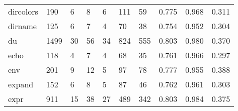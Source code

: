 \begin{longtable}{lp{2.0cm}p{2.0cm}p{2.0cm}p{2.0cm}p{2.0cm}p{2.0cm}p{2.0cm}p{2.0cm}p{2.0cm}}
dircolors &                    190 &                                  6 &                                 8 &                                6 &                               111 &                              59 &                                   0.775 &                                  0.968 &                                0.311 \\
dirname   &                    125 &                                  6 &                                 7 &                                4 &                                70 &                              38 &                                   0.754 &                                  0.952 &                                0.304 \\
du        &                   1499 &                                 30 &                                56 &                               34 &                               824 &                             555 &                                   0.803 &                                  0.980 &                                0.370 \\
echo      &                    118 &                                  4 &                                 7 &                                4 &                                68 &                              35 &                                   0.761 &                                  0.966 &                                0.297 \\
env       &                    201 &                                  9 &                                12 &                                5 &                                97 &                              78 &                                   0.777 &                                  0.955 &                                0.388 \\
expand    &                    152 &                                  6 &                                 8 &                                5 &                                87 &                              46 &                                   0.762 &                                  0.961 &                                0.303 \\
expr      &                    911 &                                 15 &                                38 &                               27 &                               489 &                             342 &                                   0.803 &                                  0.984 &                                0.375 \\

\end{longtable}
